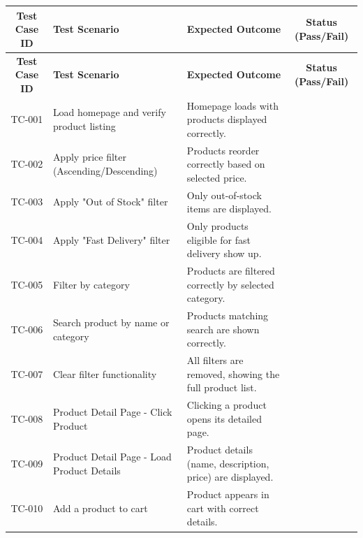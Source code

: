 \documentclass{llncs}
\begin{document}
\begin{longtable}{|c|p{4.5cm}|p{4.5cm}|c|}
    \hline
    \textbf{Test Case ID} & \textbf{Test Scenario}                     & \textbf{Expected Outcome}                                 & \textbf{Status (Pass/Fail)} \\ \hline
    \endfirsthead
    \hline
    \textbf{Test Case ID} & \textbf{Test Scenario}                     & \textbf{Expected Outcome}                                 & \textbf{Status (Pass/Fail)} \\ \hline
    \endhead
    TC-001                & Load homepage and verify product listing   & Homepage loads with products displayed correctly.         &                             \\ \hline
    TC-002                & Apply price filter (Ascending/Descending)  & Products reorder correctly based on selected price.       &                             \\ \hline
    TC-003                & Apply "Out of Stock" filter                & Only out-of-stock items are displayed.                    &                             \\ \hline
    TC-004                & Apply "Fast Delivery" filter               & Only products eligible for fast delivery show up.         &                             \\ \hline
    TC-005                & Filter by category                         & Products are filtered correctly by selected category.     &                             \\ \hline
    TC-006                & Search product by name or category         & Products matching search are shown correctly.             &                             \\ \hline
    TC-007                & Clear filter functionality                 & All filters are removed, showing the full product list.   &                             \\ \hline
    TC-008                & Product Detail Page - Click Product        & Clicking a product opens its detailed page.               &                             \\ \hline
    TC-009                & Product Detail Page - Load Product Details & Product details (name, description, price) are displayed. &                             \\ \hline
    TC-010                & Add a product to cart                      & Product appears in cart with correct details.             &                             \\ \hline

\end{longtable}
\end{document}
